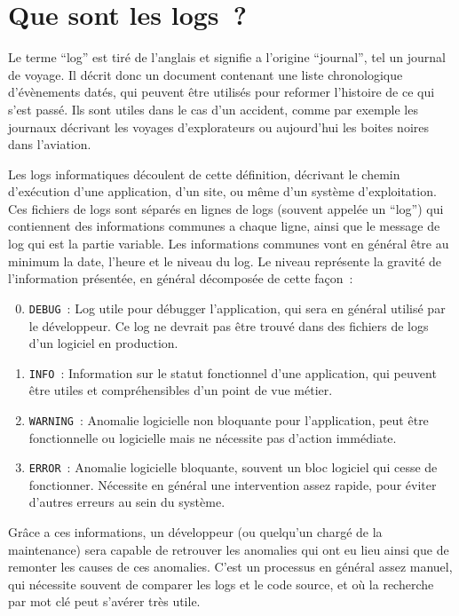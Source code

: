 \documentclass[openany, 12pt]{memoir}
\begin{document}
\newpage
\section{Que sont les logs~?}
\label{logs}

Le terme ``log'' est tiré de l'anglais et signifie a l'origine ``journal'', tel un journal de voyage. Il décrit donc un document contenant une liste chronologique d'évènements datés, qui peuvent être utilisés pour reformer l'histoire de ce qui s'est passé. Ils sont utiles dans le cas d'un accident, comme par exemple les journaux décrivant les voyages d'explorateurs ou aujourd'hui les boites noires dans l'aviation.

Les logs informatiques découlent de cette définition, décrivant le chemin d'exécution d'une application, d'un site, ou même d'un système d'exploitation. Ces fichiers de logs sont séparés en lignes de logs (souvent appelée un ``log'') qui contiennent des informations communes a chaque ligne, ainsi que le message de log qui est la partie variable. Les informations communes vont en général être au minimum la date, l'heure et le niveau du log. Le niveau représente la gravité de l'information présentée, en général décomposée de cette façon~:

\begin{enumerate}
	\setcounter{enumi}{-1}
	\item \texttt{DEBUG}~: Log utile pour débugger l'application, qui sera en général utilisé par le développeur. Ce log ne devrait pas être trouvé dans des fichiers de logs d'un logiciel en production.
	\item \texttt{INFO}~: Information sur le statut fonctionnel d'une application, qui peuvent être utiles et compréhensibles d'un point de vue métier.
	\item \texttt{WARNING}~: Anomalie logicielle non bloquante pour l'application, peut être fonctionnelle ou logicielle mais ne nécessite pas d'action immédiate.
	\item \texttt{ERROR}~: Anomalie logicielle bloquante, souvent un bloc logiciel qui cesse de fonctionner. Nécessite en général une intervention assez rapide, pour éviter d'autres erreurs au sein du système.
\end{enumerate}

Grâce a ces informations, un développeur (ou quelqu'un chargé de la maintenance) sera capable de retrouver les anomalies qui ont eu lieu ainsi que de remonter les causes de ces anomalies. C'est un processus en général assez manuel, qui nécessite souvent de comparer les logs et le code source, et où la recherche par mot clé peut s'avérer très utile.
\end{document}
